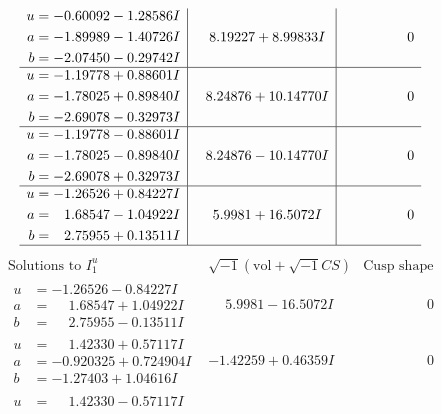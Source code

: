 \documentclass[1p]{elsarticle_modified}
\theoremstyle{definition}
\newcommand{\I}{\sqrt{-1}}
\begin{document}
$$\begin{array}{c|c|c}
\begin{aligned}
u &= -0.60092 - 1.28586 I \\
a &= -1.89989 - 1.40726 I \\
b &= -2.07450 - 0.29742 I\end{aligned}
 & \phantom{-}8.19227 + 8.99833 I & \phantom{-0.000000 } 0 \\ \hline\begin{aligned}
u &= -1.19778 + 0.88601 I \\
a &= -1.78025 + 0.89840 I \\
b &= -2.69078 - 0.32973 I\end{aligned}
 & \phantom{-}8.24876 + 10.14770 I & \phantom{-0.000000 } 0 \\ \hline\begin{aligned}
u &= -1.19778 - 0.88601 I \\
a &= -1.78025 - 0.89840 I \\
b &= -2.69078 + 0.32973 I\end{aligned}
 & \phantom{-}8.24876 - 10.14770 I & \phantom{-0.000000 } 0 \\ \hline\begin{aligned}
u &= -1.26526 + 0.84227 I \\
a &= \phantom{-}1.68547 - 1.04922 I \\
b &= \phantom{-}2.75955 + 0.13511 I\end{aligned}
 & \phantom{-}5.9981 + 16.5072 I & \phantom{-0.000000 } 0\\
 \hline 
 \end{array}$$\newpage$$\begin{array}{c|c|c}  
\text{Solutions to }I^u_{1}& \I (\text{vol} + \sqrt{-1}CS) & \text{Cusp shape}\\
 \hline 
\begin{aligned}
u &= -1.26526 - 0.84227 I \\
a &= \phantom{-}1.68547 + 1.04922 I \\
b &= \phantom{-}2.75955 - 0.13511 I\end{aligned}
 & \phantom{-}5.9981 - 16.5072 I & \phantom{-0.000000 } 0 \\ \hline\begin{aligned}
u &= \phantom{-}1.42330 + 0.57117 I \\
a &= -0.920325 + 0.724904 I \\
b &= -1.27403 + 1.04616 I\end{aligned}
 & -1.42259 + 0.46359 I & \phantom{-0.000000 } 0 \\ \hline\begin{aligned}
u &= \phantom{-}1.42330 - 0.57117 I \\

\end{aligned}
\end{array}$$
\end{document}
